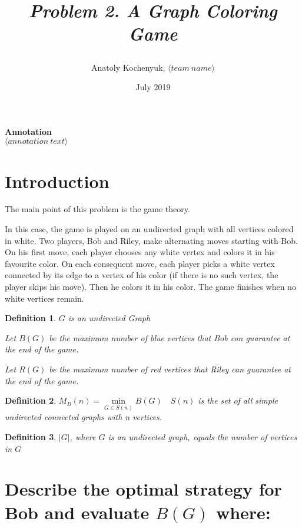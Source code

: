 \documentclass[12pt,a4paper, flushleft]{article}
\author{Anatoly Kochenyuk, $\langle team~name\rangle$}
\date{July 2019}
\title{
	\vspace{4cm}	
	\horline{440}	
	\begin{center}
		\begin{Huge}
			\textbf{\emph{Problem 2. A Graph Coloring Game}}
		\end{Huge}
	\end{center}	
	\vspace{-1.3cm}	
	\horline{460}
}
\newtheorem{Def}{Definition}[section]
\newcommand{\lr}[1]{\langle #1 \rangle}
\begin{document}
\maketitle
\vspace{4cm}
	
	\begin{myquote}
	\begin{center}
		\textbf{Annotation}\\
		\textit{
			$\lr{annotation~text}$
		}
	\end{center}
	\end{myquote}	
	
	\pagebreak

	\tableofcontents	
	
	\pagebreak
	
\section*{Introduction}
The main point of this problem is the game theory.

In this case, the game is played on an undirected graph with all vertices colored in white. Two players, Bob and Riley, make alternating moves starting with Bob. On his first move, each player chooses
any white vertex and colors it in his favourite color. On each consequent move, each player picks
a white vertex connected by its edge to a vertex of his color (if there is no such vertex, the
player skips his move). Then he colors it in his color. The game finishes when no white vertices
remain.

\begin{Def}
	$G$ is an undirected Graph

	Let $B(G)$ be the maximum number of blue vertices that Bob can guarantee at the end of
the game.

	Let $R(G)$ be the maximum number of red vertices that Riley can guarantee at the
end of the game.
\end{Def}

\begin{Def}
	$M_B(n) = \min\limits_{G\in S(n)}B(G)\quad S(n)$ is the set of all simple undirected connected graphs with n vertices.
\end{Def}

\begin{Def}
	$|G|$, where $G$ is an undirected graph, equals the number of vertices in $G$
\end{Def}

\section{Describe the optimal strategy for Bob and evaluate $B(G)$ where:}
\end{document}
